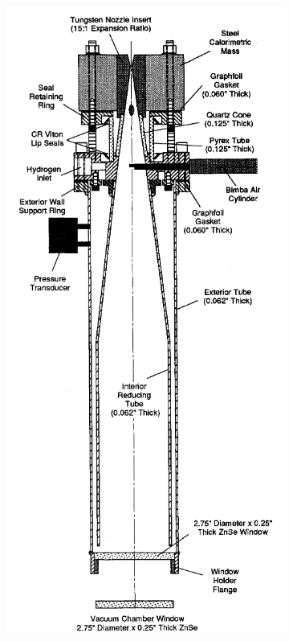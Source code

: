 \begin{figure}[!ht]
\begin{subfigure}[t]{0.3\textwidth}
                \includegraphics[width=\textwidth]{assets/2 background/BlackKrier thruster.png}

\end{subfigure}
\end{figure}
